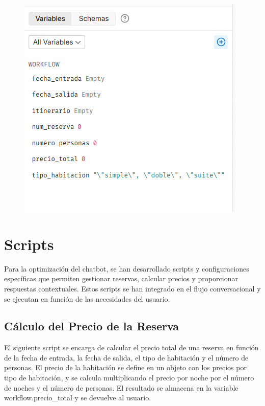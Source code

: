 \documentclass[12pt]{article}
\begin{document}
\begin{figure}[h!]
    \centering
    \includegraphics[width=.5\textwidth]{assets/Variables.jpeg}
    \label{fig:my_label}
\end{figure}

\clearpage

\section{Scripts}

Para la optimización del chatbot, se han desarrollado scripts y configuraciones específicas que permiten gestionar reservas, calcular precios y
proporcionar respuestas contextuales. Estos scripts se han integrado en el flujo conversacional y se ejecutan en función de las necesidades del usuario.

\subsection{Cálculo del Precio de la Reserva}

El siguiente script se encarga de calcular el precio total de una reserva en función de la fecha de entrada, la fecha de salida, el tipo de habitación
y el número de personas. El precio de la habitación se define en un objeto con los precios por tipo de habitación, y se calcula multiplicando el precio
por noche por el número de noches y el número de personas. El resultado se almacena en la variable workflow.precio\_total y se devuelve al usuario.
\end{document}
